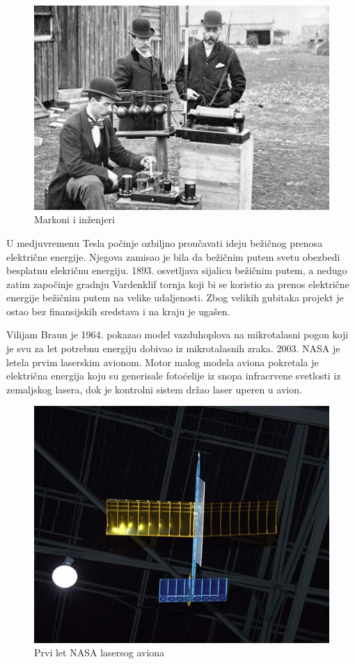 \documentclass[a4paper]{article}
\begin{document}
\begin{figure}[h!]
    \centering
    \includegraphics[scale=0.2]{Markoni.jpg}
    \caption{Markoni i inženjeri}
    \label{fig:my_labela}
\end{figure}



U medjuvremenu Tesla počinje ozbiljno proučavati ideju bežičnog prenosa električne energije. Njegova zamisao je bila da bežičnim putem svetu obezbedi besplatnu elekričnu energiju. 1893. osvetljava sijalicu bežičnim putem, a nedugo zatim započinje gradnju Vardenklif tornja
koji bi se koristio za prenos električne energije bežičnim putem na velike udaljenosti. Zbog velikih gubitaka projekt je ostao bez finansijskih sredstava i na kraju je ugašen. 

Vilijam Braun je 1964. pokazao model vazduhoplova na mikrotalasni pogon koji je svu
za let potrebnu energiju dobivao iz mikrotalasnih zraka.\cite{brown1996history}
2003. NASA je letela prvim laserskim avionom. Motor malog modela aviona pokretala je električna energija koju su generisale fotoćelije iz snopa infracrvene svetlosti iz zemaljskog lasera, dok je kontrolni sistem držao laser uperen u avion.

\begin{figure}[h!]
    \centering
    \includegraphics[scale=0.4]{aircraft.jpg}
    \caption{Prvi let NASA lasersog aviona}
    \label{fig:my_label}
\end{figure}
\end{document}
